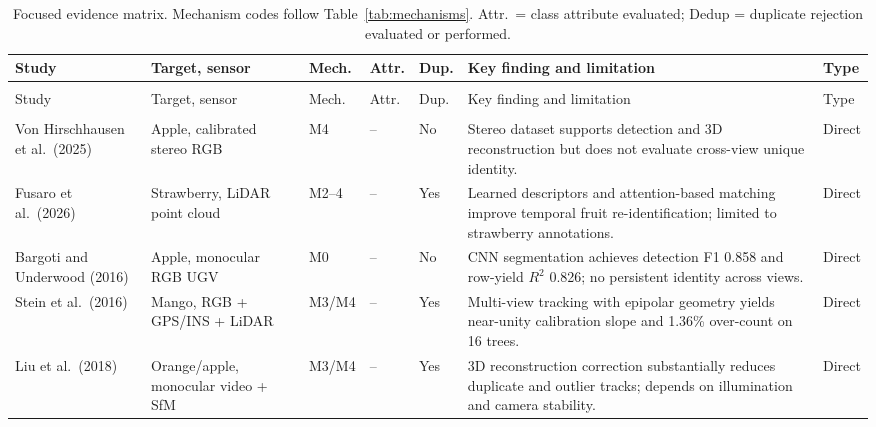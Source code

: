 \footnotesize
\setlength{\LTleft}{0pt}
\setlength{\LTright}{0pt}
\setlength{\tabcolsep}{2pt}
\begin{longtable}{@{}>{\raggedright\arraybackslash}p{}>{\raggedright\arraybackslash}p{}>{\raggedright\arraybackslash}p{}>{\raggedright\arraybackslash}p{}>{\raggedright\arraybackslash}p{}>{\raggedright\arraybackslash}p{}>{\raggedright\arraybackslash}p{}@{}}
\caption{Focused evidence matrix. Mechanism codes follow Table~\ref{tab:mechanisms}. Attr.\ = class attribute evaluated; Dedup = duplicate rejection evaluated or performed.}\label{tab:focused}\\
\toprule
Study & Target, sensor & Mech. & Attr. & Dup. & Key finding and limitation & Type\\
\midrule
\endfirsthead
\multicolumn{7}{c}{\tablename\ \thetable{} continued}\\
\toprule
Study & Target, sensor & Mech. & Attr. & Dup. & Key finding and limitation & Type\\
\midrule
\endhead
\midrule
\multicolumn{7}{r}{Continued on next page}\\
\endfoot
\bottomrule
\endlastfoot

Von Hirschhausen et al.\ (2025) \cite{ledger_m_3f8f02033fe9db3a}
& Apple, calibrated stereo RGB
& M4 & -- & No
& Stereo dataset supports detection and 3D reconstruction but does not evaluate cross-view unique identity.
& Direct\\

Fusaro et al.\ (2026) \cite{ledger_r_0eda6374aaf85fae}
& Strawberry, LiDAR point cloud
& M2--4 & -- & Yes
& Learned descriptors and attention-based matching improve temporal fruit re-identification; limited to strawberry annotations.
& Direct\\

Bargoti and Underwood (2016) \cite{ledger_r_143d70deec8d2b1d}
& Apple, monocular RGB UGV
& M0 & -- & No
& CNN segmentation achieves detection F1 0.858 and row-yield $R^2$ 0.826; no persistent identity across views.
& Direct\\

Stein et al.\ (2016) \cite{ledger_r_408d13511cac4177}
& Mango, RGB + GPS/INS + LiDAR
& M3/M4 & -- & Yes
& Multi-view tracking with epipolar geometry yields near-unity calibration slope and 1.36\% over-count on 16 trees.
& Direct\\

Liu et al.\ (2018) \cite{ledger_m_9966d81433d61ed3}
& Orange/apple, monocular video + SfM
& M3/M4 & -- & Yes
& 3D reconstruction correction substantially reduces duplicate and outlier tracks; depends on illumination and camera stability.
& Direct\\


\end{longtable}
